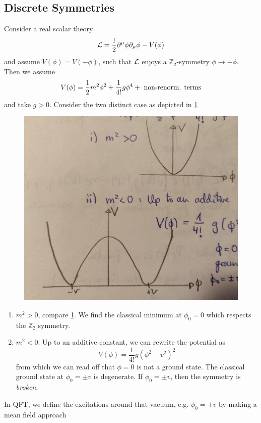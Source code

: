 \subsection{Discrete Symmetries}
Consider a real scalar theory
\begin{equation*}
	\mathcal{L} = \frac{1}{2} \partial^\mu \phi \partial_\mu \phi - V(\phi)
\end{equation*}
and assume $V(\phi)=V(-\phi)$, such that $\mathcal{L}$ enjoys a $\mathbb{Z}_2$-symmetry $\phi \rightarrow -\phi$.\\
Then we assume
\begin{equation*}
	V(\phi) = \frac{1}{2} m^2 \phi^2 + \frac{1}{4!} g \phi^4 + \text{ non-renorm. terms}
\end{equation*}
and take $g>0$. Consider the two distinct case as depicted in \ref{fig:ssb}
\begin{figure}[h!]
	\centering
	\includegraphics[width=0.7\linewidth]{gfx/YMpictures/SSB}
	\caption{}
	\label{fig:ssb}
\end{figure}
\begin{enumerate}
	\item $m^2>0$, compare \ref{fig:ssb}. We find the classical minimum at $\phi_0=0$ which respects the $\mathbb{Z}_2$ symmetry.
	\item $m^2<0$: Up to an additive constant, we can rewrite the potential as
	\begin{equation}
	V(\phi) = \frac{1}{4!} g(\phi^2- v^2)^2
	\end{equation}
	from which we can read off that $\phi=0$ is not a ground state. The classical ground state at $\phi_0=\pm v$ is degenerate. If $\phi_0=\pm v$, then the symmetry is \emph{broken}.
\end{enumerate}
In QFT, we define the excitations around that vacuum, e.g. $\phi_0=+ v$ by making a mean field approach 
